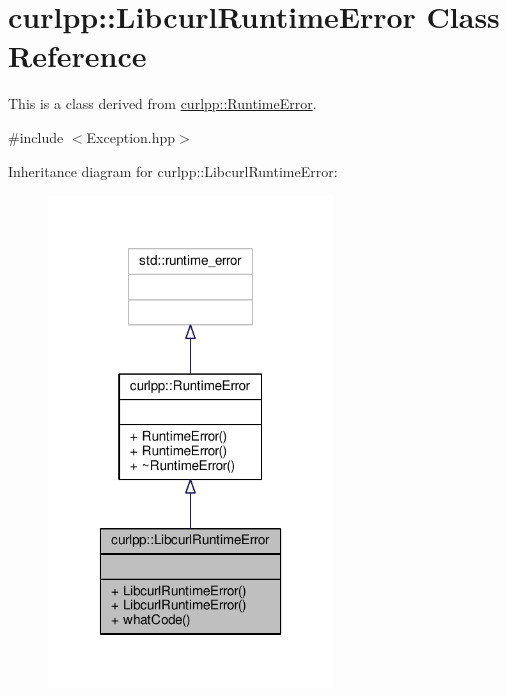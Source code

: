 \hypertarget{classcurlpp_1_1LibcurlRuntimeError}{\section{curlpp\-:\-:Libcurl\-Runtime\-Error Class Reference}
\label{classcurlpp_1_1LibcurlRuntimeError}
}


This is a class derived from \hyperlink{classcurlpp_1_1RuntimeError}{curlpp\-::\-Runtime\-Error}.  




{\ttfamily \#include $<$Exception.\-hpp$>$}



Inheritance diagram for curlpp\-:\-:Libcurl\-Runtime\-Error\-:\nopagebreak
\begin{figure}[H]
\begin{center}
\leavevmode
\includegraphics[width=214pt]{classcurlpp_1_1LibcurlRuntimeError__inherit__graph}
\end{center}
\end{figure}


